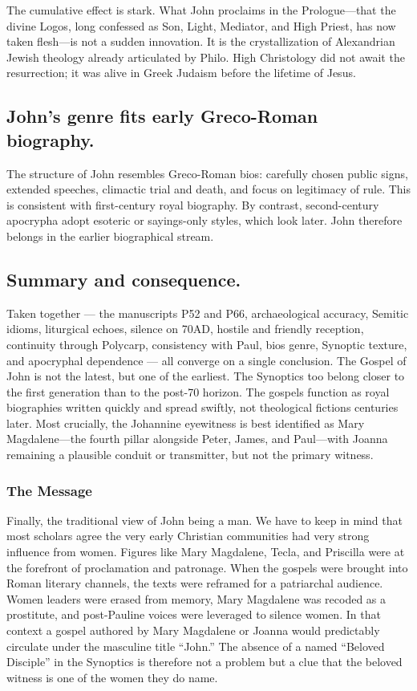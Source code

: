 The cumulative effect is stark.
What John proclaims in the Prologue—that the divine Logos, long confessed as Son, Light, Mediator, and High Priest, has now taken flesh—is not a sudden innovation.
It is the crystallization of Alexandrian Jewish theology already articulated by Philo.
High Christology did not await the resurrection; it was alive in Greek Judaism before the lifetime of Jesus.

\subsection{John’s genre fits early Greco-Roman biography.}\label{subsec:johns-genre-fits-early-greco-roman-biography.}

The structure of John resembles Greco-Roman bios: carefully chosen public signs, extended speeches, climactic trial and death, and focus on legitimacy of rule.
This is consistent with first-century royal biography.
By contrast, second-century apocrypha adopt esoteric or sayings-only styles, which look later.
John therefore belongs in the earlier biographical stream.

\subsection{Summary and consequence.}\label{subsec:summary-and-consequence.}

Taken together --- the manuscripts P52 and P66, archaeological accuracy, Semitic idioms, liturgical echoes, silence on 70AD, hostile and friendly reception, continuity through Polycarp, consistency with Paul, bios genre, Synoptic texture, and apocryphal dependence --- all converge on a single conclusion.
The Gospel of John is not the latest, but one of the earliest.
The Synoptics too belong closer to the first generation than to the post-70 horizon.
The gospels function as royal biographies written quickly and spread swiftly, not theological fictions centuries later.
Most crucially, the Johannine eyewitness is best identified as Mary Magdalene—the fourth pillar alongside Peter, James, and Paul—with Joanna remaining a plausible conduit or transmitter, but not the primary witness.

\subsubsection{The Message}\label{subsubsec:the-message}

Finally, the traditional view of John being a man.
We have to keep in mind that most scholars agree the very early Christian communities had very strong influence from women.
Figures like Mary Magdalene, Tecla, and Priscilla were at the forefront of proclamation and patronage.
When the gospels were brought into Roman literary channels, the texts were reframed for a patriarchal audience.
Women leaders were erased from memory, Mary Magdalene was recoded as a prostitute, and post-Pauline voices were leveraged to silence women.
In that context a gospel authored by Mary Magdalene or Joanna would predictably circulate under the masculine title “John.”
The absence of a named “Beloved Disciple” in the Synoptics is therefore not a problem but a clue that the beloved witness is one of the women they do name.

